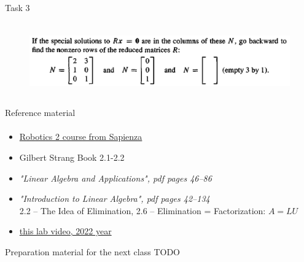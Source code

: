 \documentclass[aspectratio=169]{beamer}
\newcommand{\fbckg}[1]{\usebackgroundtemplate{\texttt{[image: \#1]}}}%
\begin{document}
\begin{frame}[t]{Task 3}
    \framesubtitle{}
    \begin{figure}[H]
        \centering\includegraphics[height=3cm,width=1\textwidth,keepaspectratio]{3.png}
        \label{fig:3.png}
    \end{figure}
\end{frame}

\begin{frame}[t]{Reference material}
    \framesubtitle{}
    \Large
    \begin{itemize}
        \item \href{http://diag.uniroma1.it/~deluca/rob2_en.php}{Robotics 2 course from Sapienza}
        \item Gilbert Strang Book 2.1-2.2
        \item \textit{"Linear Algebra and Applications", pdf pages 46--86 }
        \item \textit{"Introduction to Linear Algebra", pdf pages 42--134 }\\  2.2 -- The Idea of Elimination, 2.6 -- Elimination = Factorization: $A=LU$
        \item \href{https://youtu.be/95KM1JWs_Bg}{this lab video, 2022 year}
    \end{itemize}
\end{frame}

\begin{frame}[t]{Preparation material for the next class}
TODO
\end{frame}

\fbckg{fibeamer/figs/last_page.png}
\frame[plain]{}
\end{document}
